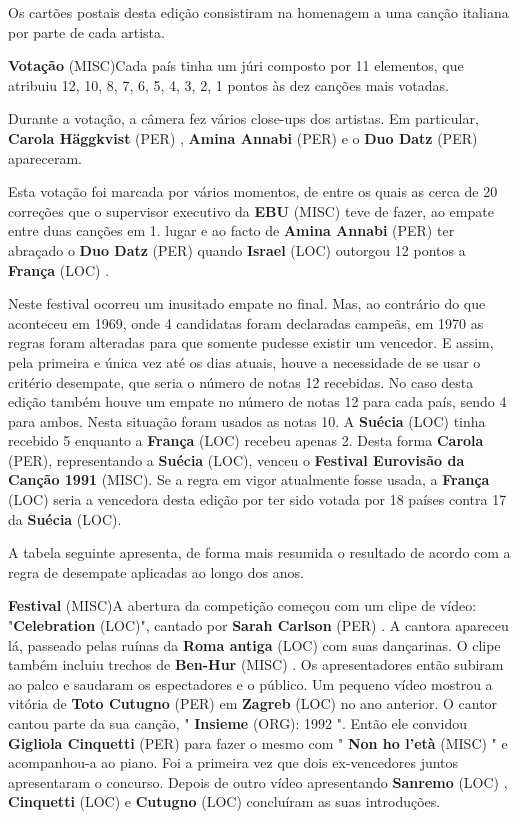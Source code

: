 \documentclass[12pt,a4paper]{article}
\begin{document}
Os cartões postais desta edição consistiram na homenagem a uma canção italiana por parte de cada artista.



\textbf{Votação} (MISC)Cada país tinha um júri composto por 11 elementos, que atribuiu 12, 10, 8, 7, 6, 5, 4, 3, 2, 1 pontos às dez canções mais votadas.

Durante a votação, a câmera fez vários close-ups dos artistas. Em particular, \textbf{Carola Häggkvist} (PER) , \textbf{Amina Annabi} (PER) e o \textbf{Duo Datz} (PER) apareceram.

Esta votação foi marcada por vários momentos, de entre os quais as cerca de 20 correções que o supervisor executivo da \textbf{EBU} (MISC) teve de fazer, ao empate entre duas canções em 1. lugar e ao facto de \textbf{Amina Annabi} (PER) ter abraçado o \textbf{Duo Datz} (PER) quando \textbf{Israel} (LOC) outorgou 12 pontos a \textbf{França} (LOC) .

Neste festival ocorreu um inusitado empate no final. Mas, ao contrário do que aconteceu em 1969, onde 4 candidatas foram declaradas campeãs, em 1970 as regras foram alteradas para que somente pudesse existir um vencedor. E assim, pela primeira e única vez até os dias atuais, houve a necessidade de se usar o critério desempate, que seria o número de notas 12 recebidas. No caso desta edição também houve um empate no número de notas 12 para cada país, sendo 4 para ambos. Nesta situação foram usados as notas 10. A \textbf{Suécia} (LOC) tinha recebido 5 enquanto a \textbf{França} (LOC) recebeu apenas 2. Desta forma \textbf{Carola} (PER), representando a \textbf{Suécia} (LOC), venceu o \textbf{Festival Eurovisão da Canção 1991} (MISC). Se a regra em vigor atualmente fosse usada, a \textbf{França} (LOC) seria a vencedora desta edição por ter sido votada por 18 países contra 17 da \textbf{Suécia} (LOC).

A tabela seguinte apresenta, de forma mais resumida o resultado de acordo com a regra de desempate aplicadas ao longo dos anos.



\textbf{Festival} (MISC)A abertura da competição começou com um clipe de vídeo: "\textbf{Celebration} (LOC)", cantado por \textbf{Sarah Carlson} (PER) . A cantora apareceu lá, passeado pelas ruínas da \textbf{Roma antiga} (LOC) com suas dançarinas. O clipe também incluiu trechos de \textbf{Ben-Hur} (MISC) . Os apresentadores então subiram ao palco e saudaram os espectadores e o público. Um pequeno vídeo mostrou a vitória de \textbf{Toto Cutugno} (PER) em \textbf{Zagreb} (LOC) no ano anterior. O cantor cantou parte da sua canção, " \textbf{Insieme} (ORG): 1992 ". Então ele convidou \textbf{Gigliola Cinquetti} (PER) para fazer o mesmo com " \textbf{Non ho l'età} (MISC) " e acompanhou-a ao piano. Foi a primeira vez que dois ex-vencedores juntos apresentaram o concurso. Depois de outro vídeo apresentando \textbf{Sanremo} (LOC) , \textbf{Cinquetti} (LOC) e \textbf{Cutugno} (LOC) concluíram as suas introduções.
\end{document}
